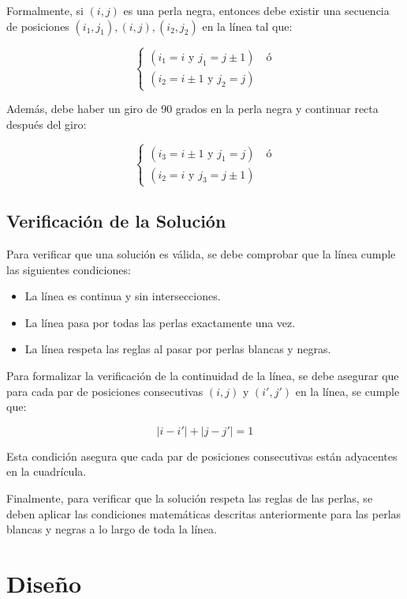 \documentclass{article}
\begin{document}
Formalmente, si \( (i, j) \) es una perla negra, entonces debe existir una secuencia de posiciones \( (i_1, j_1), (i, j), (i_2, j_2) \) en la línea tal que:

\[
\begin{cases}
(i_1 = i \text{ y } j_1 = j \pm 1) \quad \text{ó}\\
(i_2 = i \pm 1 \text{ y } j_2 = j)
\end{cases}
\]

Además, debe haber un giro de 90 grados en la perla negra y continuar recta después del giro:

\[
\begin{cases}
(i_3 = i \pm 1 \text{ y } j_1 = j) \quad \text{ó}\\
(i_2 = i \text{ y } j_3 = j \pm 1)
\end{cases}
\]

\subsection{Verificación de la Solución}

Para verificar que una solución es válida, se debe comprobar que la línea cumple las siguientes condiciones:

\begin{itemize}
    \item La línea es continua y sin intersecciones.
    \item La línea pasa por todas las perlas exactamente una vez.
    \item La línea respeta las reglas al pasar por perlas blancas y negras.
\end{itemize}

Para formalizar la verificación de la continuidad de la línea, se debe asegurar que para cada par de posiciones consecutivas \( (i, j) \) y \( (i', j') \) en la línea, se cumple que:

\[
|i - i'| + |j - j'| = 1
\]

Esta condición asegura que cada par de posiciones consecutivas están adyacentes en la cuadrícula.

Finalmente, para verificar que la solución respeta las reglas de las perlas, se deben aplicar las condiciones matemáticas descritas anteriormente para las perlas blancas y negras a lo largo de toda la línea.

\section{Diseño}
\end{document}
